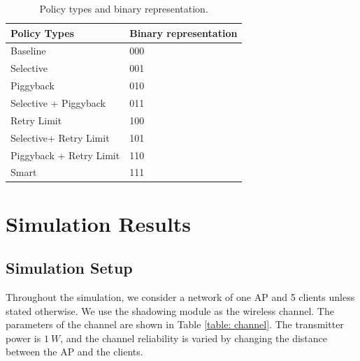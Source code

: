 \documentclass{article}
\begin{document}
\begin{table}[htbp]
   \centering
   \caption{Policy types and binary representation.}
   \label{Policy Types}
   \begin{tabular}{| P{4cm} | P{3.5cm} |}
       \hline
       Policy Types   &  Binary representation\\   \hline
       Baseline &  000\\ \hline
       Selective & 001\\ \hline
       Piggyback & 010\\ \hline
       Selective + Piggyback & 011\\ \hline
       Retry Limit  &100\\ \hline
       Selective+ Retry Limit & 101\\ \hline
       Piggyback + Retry Limit & 110\\ \hline
       Smart &  111\\
       \hline
   \end{tabular}
\label{table: policy}
\end{table} 




\section{Simulation Results}
\subsection{Simulation Setup}
\label{section: simulation: setup}
Throughout the simulation, we consider a network of one AP and 5 clients unless stated otherwise. We use the shadowing module as the wireless channel. The parameters of the channel are shown in Table \ref{table: channel}. The transmitter power is $\SI{1}{W}$, and the channel reliability is varied by changing the distance between the AP and the clients. 
\end{document}
